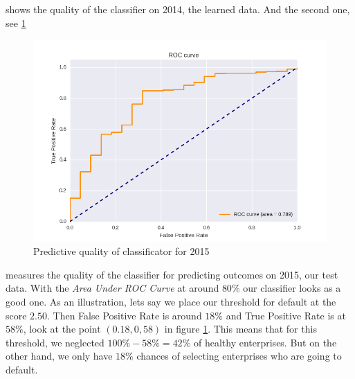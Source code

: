 \documentclass[DIV=calc, paper=a4, fontsize=11pt, twocolumn]{scrartcl}
\begin{document}
shows the quality of the classifier on 2014, the learned data. And the second one, see \ref{fig:roc_2015}
\begin{figure}
  \centering
    \includegraphics[width=\linewidth]{roc_2015}
  \caption{Predictive quality of classificator for 2015}
  \label{fig:roc_2015}
\end{figure}
measures the quality of the classifier for predicting outcomes on 2015, our test data. With the \emph{Area Under ROC Curve} at around $80\%$ our classifier looks as a good one. As an illustration, lets say we place our threshold for default at the score $2.50$. Then False Positive Rate is around $18\%$ and True Positive Rate is at $58\%$, look at the point $(0.18, 0,58)$ in figure \ref{fig:roc_2015}. This means that for this threshold, we neglected $100\% - 58\% = 42\%$ of healthy enterprises. But on the other hand, we only have $18\%$ chances of selecting enterprises who are going to default.
\end{document}
